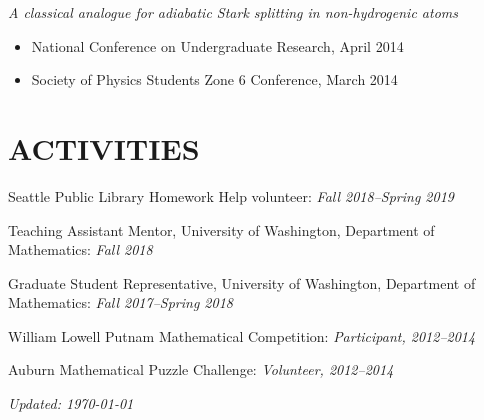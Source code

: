 \documentclass{res}
\begin{document}
\begin{resume}
{\it A classical analogue for adiabatic Stark splitting in non-hydrogenic atoms}
\begin{itemize}
\item National Conference on Undergraduate Research, April 2014
\item Society of Physics Students Zone 6 Conference, March 2014
\end{itemize}





\begin{comment}
\section{PROFESSIONAL and HONORARY MEMBERSHIP}
	\vspace{2mm}

Mathematical Association of America \textit{and the} American Mathematical Society

Auburn University Honors College

Auburn University Math Club: \textit{Vice President (Fall 2014 - Spring 2015)}

Auburn University Society of Physics Students: \textit{Treasurer (Fall 2012 - Spring 2013), Vice President (Fall 2013 - Spring 2014)}



\section{COMPUTER SKILLS}
	\vspace{2mm}   

	\LaTeX, SageMath, Python

\end{comment}


\section{ACTIVITIES}
	\vspace{2mm}

Seattle Public Library Homework Help volunteer: \textit{Fall 2018--Spring 2019}

Teaching Assistant Mentor, University of Washington, Department of Mathematics: \textit{Fall 2018}

Graduate Student Representative, University of Washington, Department of Mathematics: \textit{Fall 2017--Spring 2018}

William Lowell Putnam Mathematical Competition: \textit{Participant, 2012--2014}

Auburn Mathematical Puzzle Challenge: \textit{Volunteer, 2012--2014}

\vfill

\begin{center}
	\textit{Updated: \today}
\end{center}




\end{resume}
\end{document}
